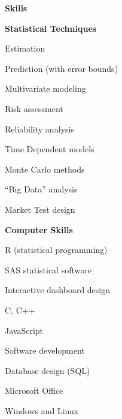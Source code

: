 \documentclass[letterpaper,12pt,final]{memoir}
\newcommand{\MedSep}{\vspace{1em}}
\newcommand{\SmallSep}{\vspace{0.5em}}
\newcommand{\CVSection}[1]
	{\Large\textbf{#1}\par
	\SmallSep\normalsize\normalfont}
\newcommand{\CVItem}[1]
	{\textbf{\color{RoyalBlue} #1}}
\begin{document}
\CVSection{Skills}
\CVItem{Statistical Techniques}
\begin{multicols}{3}
\begin{compactitem}[\color{RoyalBlue}$\bullet$]
	\item Estimation 
	\item Prediction (with error bounds)
	\item Multivariate modeling
	\item Risk assessment 
	\item Reliability analysis
	\item Time Dependent models
	\item Monte Carlo methods
	\item ``Big Data'' analysis
	\item Market Test design
\end{compactitem}
\end{multicols}
\SmallSep
\CVItem{Computer Skills}
\begin{multicols}{3}
\begin{compactitem}[\color{RoyalBlue}$\bullet$]
	\item R (statistical programming)
  \item SAS statistical software
	\item Interactive dashboard design
	\item C, C++
	\item JavaScript
	\item Software development
	\item Database design (SQL)
  \item Microsoft Office
  \item Windows and Linux
\end{compactitem}
\end{multicols}

\MedSep 
\end{document}
